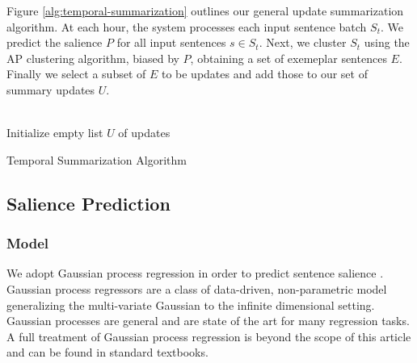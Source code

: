
Figure \ref{alg:temporal-summarization} outlines our general update
summarization algorithm.  At each hour, the system processes each input 
sentence batch $S_t$.
We predict the salience $P$ for all input sentences $s\in S_t$.
Next, we cluster $S_t$ using the AP clustering algorithm, biased by $P$,
obtaining a set of exemeplar sentences $E$. Finally we select a subset of $E$
to be updates and add those to our set of summary updates $U$.

\begin{algorithm}%
 ~\\
 Initialize empty list $U$ of updates\\
 \caption{Temporal Summarization Algorithm}\label{alg:temporal-summarization}
\end{algorithm}

\subsection{Salience Prediction}


\subsubsection{Model}
We adopt Gaussian process regression in order to predict sentence salience
\cite{rasmussen:gaussian-process-book}.  Gaussian process regressors are a
class of data-driven, non-parametric model generalizing the multi-variate
Gaussian to the infinite dimensional setting.  Gaussian processes are general
and are state of the art for many regression tasks.  A full treatment of
Gaussian process regression is beyond the scope of this article and can be
found in standard textbooks.


